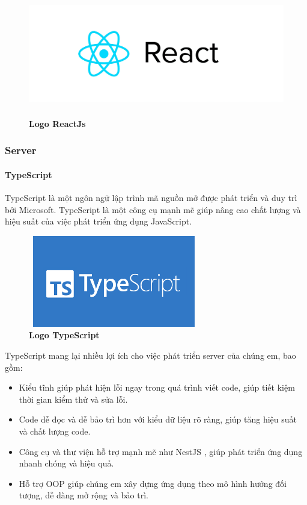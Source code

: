 \begin{figure}[H]
	\centering
	\includegraphics[width=15cm,height=5.4cm]{Images/Technology/react_logo.png}
	\caption[Logo ReactJs]{\bfseries \fontsize{12pt}{0pt}
		\selectfont Logo ReactJs}
	\label{reactjs_cover} %
\end{figure}

\subsubsection{Server}
\paragraph{TypeScript}
\mbox{}

TypeScript là một ngôn ngữ lập trình mã nguồn mở được phát triển và duy trì bởi Microsoft. TypeScript là một công cụ mạnh mẽ giúp nâng cao chất lượng và hiệu suất của việc phát triển ứng dụng JavaScript.

\begin{figure}[H]
	\centering
	\includegraphics[width=7.5cm,height=4cm]{Images/Technology/typescript.png}
	\caption[Logo TypeScript]{\bfseries \fontsize{12pt}{0pt}
		\selectfont Logo TypeScript}
	\label{typescript} %
\end{figure}

TypeScript mang lại nhiều lợi ích cho việc phát triển server của chúng em, bao gồm:
\begin{itemize}
	\item Kiểu tĩnh giúp phát hiện lỗi ngay trong quá trình viết code, giúp tiết kiệm thời gian kiểm thử và sửa lỗi.
	\item Code dễ đọc và dễ bảo trì hơn với kiểu dữ liệu rõ ràng, giúp tăng hiệu suất và chất lượng code.
	\item Công cụ và thư viện hỗ trợ mạnh mẽ như NestJS \cite{nestjs}, giúp phát triển ứng dụng nhanh chóng và hiệu quả.
	\item Hỗ trợ OOP giúp chúng em xây dựng ứng dụng theo mô hình hướng đối tượng, dễ dàng mở rộng và bảo trì.
\end{itemize}

